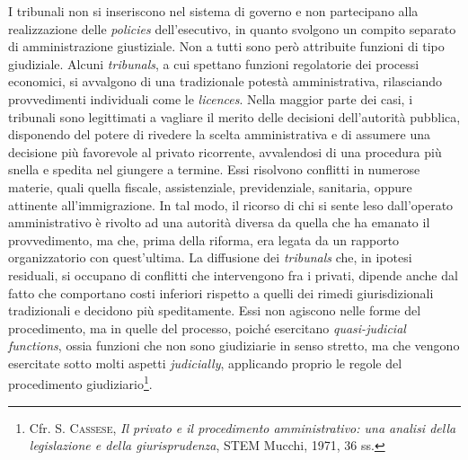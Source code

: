 \documentclass[12pt,it,a4paper,]{report}
\begin{document}
I tribunali non si inseriscono nel sistema di governo e non partecipano
alla realizzazione delle \emph{policies} dell'esecutivo, in quanto
svolgono un compito separato di amministrazione giustiziale. Non a tutti
sono però attribuite funzioni di tipo giudiziale. Alcuni
\emph{tribunals}, a cui spettano funzioni regolatorie dei processi
economici, si avvalgono di una tradizionale potestà amministrativa,
rilasciando provvedimenti individuali come le \emph{licences}. Nella
maggior parte dei casi, i tribunali sono legittimati a vagliare il
merito delle decisioni dell'autorità pubblica, disponendo del potere di
rivedere la scelta amministrativa e di assumere una decisione più
favorevole al privato ricorrente, avvalendosi di una procedura più
snella e spedita nel giungere a termine. Essi risolvono conflitti in
numerose materie, quali quella fiscale, assistenziale, previdenziale,
sanitaria, oppure attinente all'immigrazione. In tal modo, il ricorso di
chi si sente leso dall'operato amministrativo è rivolto ad una autorità
diversa da quella che ha emanato il provvedimento, ma che, prima della
riforma, era legata da un rapporto organizzatorio con quest'ultima. La
diffusione dei \emph{tribunals} che, in ipotesi residuali, si occupano
di conflitti che intervengono fra i privati, dipende anche dal fatto che
comportano costi inferiori rispetto a quelli dei rimedi giurisdizionali
tradizionali e decidono più speditamente. Essi non agiscono nelle forme
del procedimento, ma in quelle del processo, poiché esercitano
\emph{quasi-judicial functions}, ossia funzioni che non sono giudiziarie
in senso stretto, ma che vengono esercitate sotto molti aspetti
\emph{judicially}, applicando proprio le regole del procedimento
giudiziario\footnote{Cfr. S. \textsc{Cassese}, \emph{Il privato e il
  procedimento amministrativo: una analisi della legislazione e della
  giurisprudenza}, STEM Mucchi, 1971, 36 ss.}.
\end{document}
